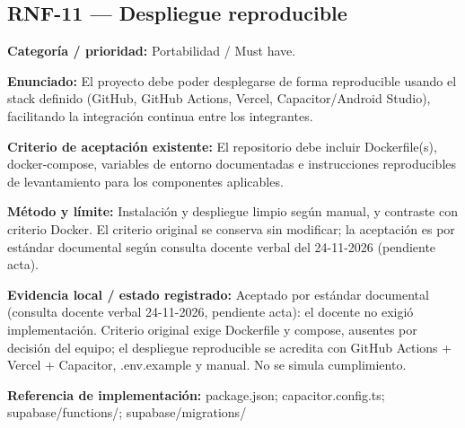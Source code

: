 \subsection{RNF-11 — Despliegue reproducible}
\textbf{Categoría / prioridad:} Portabilidad / Must have.\par
\textbf{Enunciado:} El proyecto debe poder desplegarse de forma reproducible usando el stack definido (GitHub, GitHub Actions, Vercel, Capacitor/Android Studio), facilitando la integración continua entre los integrantes.\par
\textbf{Criterio de aceptación existente:} El repositorio debe incluir Dockerfile(s), docker-compose, variables de entorno documentadas e instrucciones reproducibles de levantamiento para los componentes aplicables.\par
\textbf{Método y límite:} Instalación y despliegue limpio según manual, y contraste con criterio Docker. El criterio original se conserva sin modificar; la aceptación es por estándar documental según consulta docente verbal del 24-11-2026 (pendiente acta).\par
\textbf{Evidencia local / estado registrado:} Aceptado por estándar documental (consulta docente verbal 24-11-2026, pendiente acta): el docente no exigió implementación. Criterio original exige Dockerfile y compose, ausentes por decisión del equipo; el despliegue reproducible se acredita con GitHub Actions + Vercel + Capacitor, .env.example y manual. No se simula cumplimiento.\par
\textbf{Referencia de implementación:} package.json; capacitor.config.ts; supabase/functions/; supabase/migrations/\par


